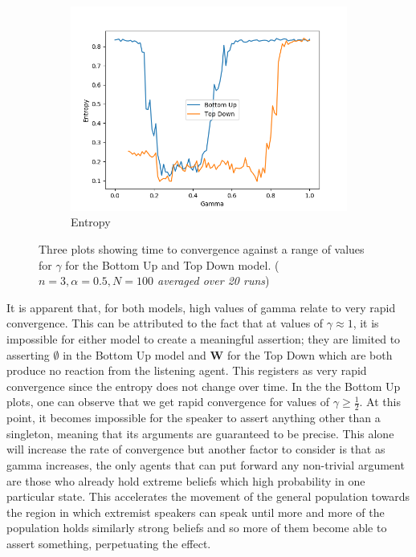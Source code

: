 \begin{figure}[H]
\begin{subfigure}[ht]{0.45\textwidth}
    \includegraphics[width=\textwidth]{Images/Figures/All/Entropy_ALL_n_3_p_100_gamma_100_runs_20.png}
    \caption{Entropy}
 \end{subfigure}
 \caption{Three plots showing time to convergence against a range of values for $\gamma$ for the Bottom Up and Top Down model. (\textit{$n=3, \alpha = 0.5, N = 100$ averaged over 20 runs})}\label{fig:convergence_none}
\end{figure}

It is apparent that, for both models, high values of gamma relate to very rapid convergence. This can be attributed to the fact that at values of $\gamma \approx 1$, it is impossible for either model to create a meaningful assertion; they are limited to asserting $\emptyset$ in the Bottom Up model and $\mathbf{W}$ for the Top Down which are both produce no reaction from the listening agent. This registers as very rapid convergence since the entropy does not change over time. 
In the the Bottom Up plots, one can observe that we get rapid convergence for values of $\gamma \geq \frac{1}{2}$. At this point, it becomes impossible for the speaker to assert anything other than a singleton, meaning that its arguments are guaranteed to be precise. This alone will increase the rate of convergence but another factor to consider is that as gamma increases, the only agents that can put forward any non-trivial argument are those who already hold extreme beliefs which high probability in one particular state. This accelerates the movement of the general population towards the region in which extremist speakers can speak until more and more of the population holds similarly strong beliefs and so more of them become able to assert something, perpetuating the effect. 

